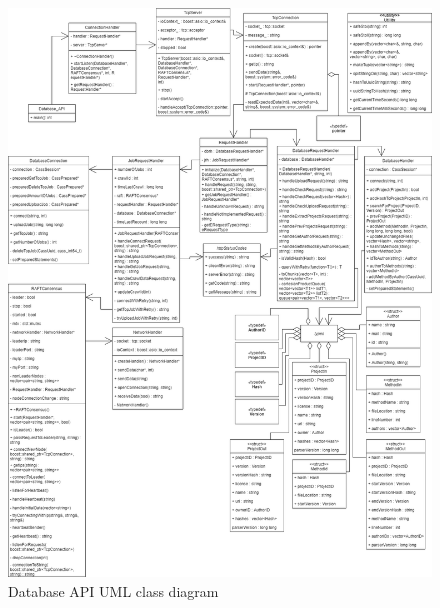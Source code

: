 \documentclass{article}
\begin{document}
\begin{figure}
    \centering
    \includegraphics[width = \linewidth]{DatabaseAPIUML.png}
    \caption{Database API UML class diagram}
    \label{fig:umldatabase}
\end{figure}
\end{document}
